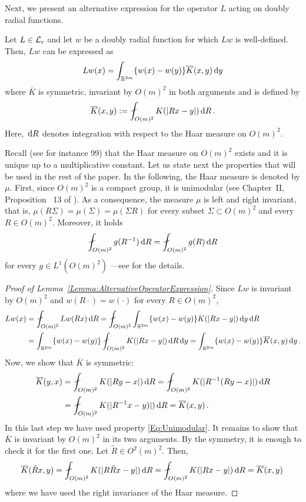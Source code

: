 Next, we present an alternative expression for the operator $L$ acting on doubly radial functions.

\begin{lemma} \label{Lemma:AlternativeOperatorExpression}
Let $L\in \mathcal{L}_{\mathrm{r}}$ and let $w$ be a doubly radial function for which $Lw$ is well-defined. Then, $Lw$ can be expressed as
$$
Lw(x) = \int_{\mathbb{R}^{2m}} \{w(x) - w(y)\} \overline{K}(x,y) \,\mathrm{d} y
$$
where $\overline{K}$ is symmetric, invariant by $O(m)^2$ in both arguments and is defined by
\begin{equation}
\label{Eq:KbarDef}
\overline{K}(x,y) := \average_{O(m)^2} K(|Rx - y|)\d R\,.
\end{equation}
Here, $\,\mathrm{d} R$ denotes integration with respect to the Haar measure on $O(m)^2$.
\end{lemma}

Recall (see for instance 99) that the Haar measure on $O(m)^2$ exists and it is unique up to a
multiplicative constant. Let us state next the properties that will be used in the rest of the
paper. In the following, the Haar measure is denoted by $\mu$. First, since $O(m)^2$ is a compact
group, it is unimodular (see Chapter~II, Proposition~ 13 of \cite{Nachbin}). As a consequence, the
measure $\mu$ is left and right invariant, that is, $\mu(R\Sigma) = \mu(\Sigma) = \mu(\Sigma R) $
for every subset $\Sigma \subset O(m)^2$ and every $R\in O(m)^2$. Moreover, it holds
\begin{equation}
\label{Eq:Unimodular}
\average_{O(m)^2} g(R^{-1}) \d R = \average_{O(m)^2} g(R) \d R
\end{equation}	
for every $g\in L^1(O(m)^2)$ ---see \cite{Nachbin} for the details.

\begin{proof}[Proof of Lemma~\ref{Lemma:AlternativeOperatorExpression}]
Since $Lw$ is invariant by $O(m)^2$ and $w(R \cdot) = w(\cdot)$ for every $R\in O(m)^2$,
\begin{align*}
Lw(x) &= \average_{O(m)^2} Lw(Rx)\d R =  \average_{O(m)^2} \int_{\R^{2m}} \{w(x) - w(y)\}K(|Rx - y|) \d y \d R\\
&= \int_{\R^{2m}} \{w(x) - w(y)\}  \average_{O(m)^2} K(|Rx - y|) \d R  \d y = \int_{\R^{2m}} \{w(x) - w(y)\}  \overline{K}(x,y) \d y\,.
\end{align*}
Now, we show that $\overline{K}$ is symmetric:
\begin{align*}
\overline{K}(y,x) &= \average_{O(m)^2} K(|R y - x|)\d R = \average_{O(m)^2} K(|R^{-1} (R y - x)|)\d R \\
&= \average_{O(m)^2} K(|R^{-1}x-y)|)\d R = \overline{K}(x,y)\,.
\end{align*}
In this last step we have used property \eqref{Eq:Unimodular}. It remains to show that
$\overline{K}$ is invariant by $O(m)^2$ in its two arguments. By the symmetry, it is enough to
check it for the first one. Let $\tilde{R} \in O^2(m)^2$. Then,
$$
\overline{K} (\tilde{R}x, y) = \average_{O(m)^2} K(|R \tilde{R} x - y|)\d R  = \average_{O(m)^2} K(|R x - y|)\d R = \overline{K} (x, y)\,
$$
where we have used the right invariance of the Haar measure.
\end{proof}

